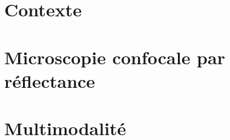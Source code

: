 \documentclass[english,standardlists]{spimubphdthesis}
\begin{document}
\tableofcontents

\mainmatter
\renewcommand\chaptermark[1]{\markboth{\uppercase{#1}}{}}




\part{Contexte}
\label{part:contexte}




\part{Microscopie confocale par réflectance}
\label{part:microscopie}





\part{Multimodalité}
\label{part:multimodal}





\backmatter





\listoffigures

\listoftables


\printglossary[type=\acronymtype,style=listfracr,title={Liste des acronymes}]

\appendix
% 
\end{document}
